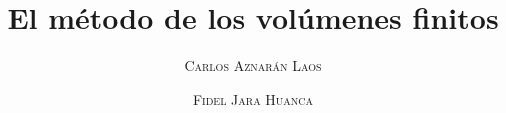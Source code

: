\usepackage[spanish]{babel}
\usepackage[svgnames]{xcolor}
\usepackage[intlimits]{mathtools}
\usepackage{diffcoeff}
\usepackage{amssymb}
\usepackage{amsthm}
\usepackage{academicons}
\usepackage[fixed]{fontawesome5}

\usepackage[
	citestyle=numeric,
	backend=biber,
	defernumbers=true,
	maxcitenames=4
]{biblatex}



\theoremstyle{definition}
\newtheorem{definition}{Definición}
\newtheorem{example}{Ejemplo}
\newtheorem{theorem}{Teorema}

\decimalpoint

\let\oldforall\forall
\renewcommand{\forall}{\oldforall \, }
\let\oldexist\exists
\renewcommand{\exists}{\oldexist \: }

\makeatletter
\def\@fnsymbol#1{%
	\ifcase#1\or
		\TextOrMath \textdagger \dagger\or
		\TextOrMath \textdaggerdbl \ddagger \or
		\TextOrMath \textsection  \mathsection\or
		\TextOrMath \textparagraph \mathparagraph\or
		\TextOrMath \textbardbl \|\or
		\TextOrMath {\textdagger\textdagger}{\dagger\dagger}\or
		\TextOrMath {\textdaggerdbl\textdaggerdbl}{\ddagger\ddagger}\else
		\@ctrerr \fi
}
\makeatother

\providecommand{\MVAt}{{\usefont{U}{mvs}{m}{n}\symbol{`@}}}

\title{\sffamily\bfseries\Large\color{DarkBlue}
	El método de los volúmenes finitos
}
\author{\normalfont\normalsize\scshape
	\href{https://orcid.org/0000-0001-8314-2271}{\textcolor{orcidcolor}{\aiOrcid}}
	Carlos Aznarán Laos
	\and\normalfont\normalsize\scshape
	\href{https://orcid.org/0009-0000-1884-1949}{\textcolor{orcidcolor}{\aiOrcid}}
	Fidel Jara Huanca
}

